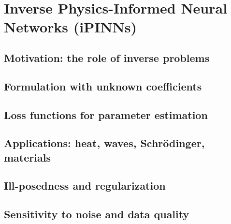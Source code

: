 ﻿\chapter{Inverse Physics-Informed Neural Networks (iPINNs)}
\section{Motivation: the role of inverse problems}

\section{Formulation with unknown coefficients}

\section{Loss functions for parameter estimation}

\section{Applications: heat, waves, Schrödinger, materials}

\section{Ill-posedness and regularization}

\section{Sensitivity to noise and data quality}


